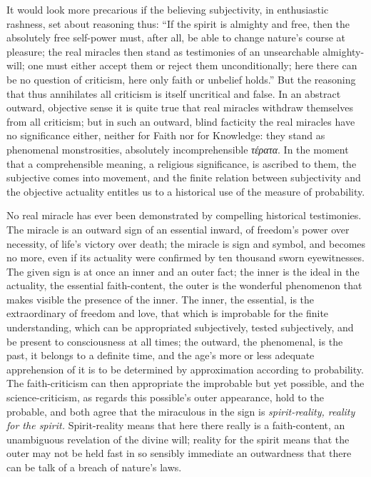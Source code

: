 \documentclass[12pt]{article}
\begin{document}
It would look more precarious if the believing subjectivity, in enthusiastic
rashness, set about reasoning thus: ``If the spirit is almighty and free, then
the absolutely free self-power must, after all, be able to change nature's
course at pleasure; the real miracles then stand as testimonies of an
unsearchable almighty-will; one must either accept them or reject them
unconditionally; here there can be no question of criticism, here only faith
or unbelief holds.'' But the reasoning that thus annihilates all criticism is
itself uncritical and false. In an abstract outward, objective sense it is
quite true that real miracles withdraw themselves from all criticism; but in
such an outward, blind facticity the real miracles have no significance
either, neither for Faith nor for Knowledge: they stand as phenomenal
monstrosities, absolutely incomprehensible \textit{τέρατα}. In the moment that
a comprehensible meaning, a religious significance, is ascribed to them, the
subjective comes into movement, and the finite relation between subjectivity
and the objective actuality entitles us to a historical use of the measure of
probability.

No real miracle has ever been demonstrated by compelling historical
testimonies. The miracle is an outward sign of an essential inward, of
freedom's power over necessity, of life's victory over death; the miracle is
sign and symbol, and becomes no more, even if its actuality were confirmed by
ten thousand sworn eyewitnesses. The given sign is at once an inner and an
outer fact; the inner is the ideal in the actuality, the essential
faith-content, the outer is the wonderful phenomenon that makes visible the
presence of the inner. The inner, the essential, is the extraordinary of
freedom and love, that which is improbable for the finite understanding, which
can be appropriated subjectively, tested subjectively, and
be present to consciousness at all times; the outward, the phenomenal, is the
past, it belongs to a definite time, and the age's more or less adequate
apprehension of it is to be determined by approximation according to
probability. The faith-criticism can then appropriate the improbable but yet
possible, and the science-criticism, as regards this possible's outer
appearance, hold to the probable, and both agree that the miraculous in the
sign is \emph{spirit-reality, reality for the spirit.} Spirit-reality means
that here there really is a faith-content, an unambiguous revelation of the
divine will; reality for the spirit means that the outer may not be held fast
in so sensibly immediate an outwardness that there can be talk of a breach of
nature's laws.
\end{document}
